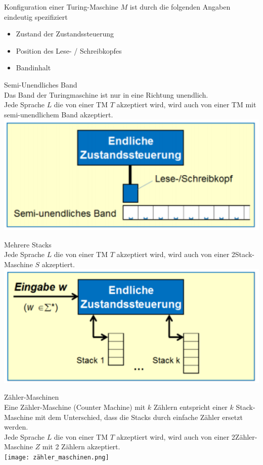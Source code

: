 \begin{definition}{Konfiguration}
    einer Turing-Maschine $M$ ist durch die folgenden Angaben eindeutig spezifiziert
    \begin{itemize}
    \item Zustand der Zustandssteuerung
    \item Position des Lese- / Schreibkopfes
    \item Bandinhalt
    \end{itemize}
\end{definition}

\begin{concept}{Semi-Unendliches Band}\\
    Das Band der Turingmaschine ist nur in eine Richtung unendlich.\\
    Jede Sprache $L$ die von einer TM $T$ akzeptiert wird, wird auch von einer TM mit semi-unendlichem Band akzeptiert.\\
    \includegraphics[width=0.3\linewidth]{semi_unendliches_band.png}
\end{concept}

\begin{concept}{Mehrere Stacks}\\
    Jede Sprache $L$ die von einer TM $T$ akzeptiert wird, wird auch von einer 2Stack-Maschine $S$ akzeptiert.\\
    \includegraphics[width=0.3\linewidth]{mehrere_stacks_tm.png}
\end{concept}

\begin{concept}{Zähler-Maschinen}\\
    Eine Zähler-Maschine (Counter Machine) mit $k$ Zählern entspricht einer $k$ Stack-Maschine mit dem Unterschied, dass die Stacks durch einfache Zähler ersetzt werden.\\
    Jede Sprache $L$ die von einer TM $T$ akzeptiert wird, wird auch von einer 2Zähler-Maschine $Z$ mit 2 Zählern akzeptiert.\\
    \texttt{[image: zähler\_maschinen.png]}
\end{concept}

